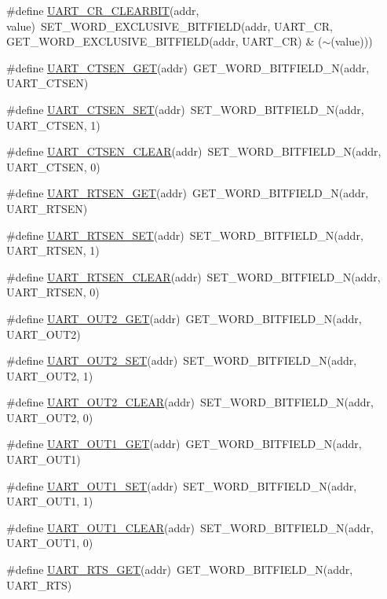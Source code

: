 \begin{DoxyCompactItemize}
\item 
\#define \hyperlink{a00574_aed8539f210ad9a5b33fb21ee09d866b7}{UART\_\-CR\_\-CLEARBIT}(addr, value)~SET\_\-WORD\_\-EXCLUSIVE\_\-BITFIELD(addr, UART\_\-CR, GET\_\-WORD\_\-EXCLUSIVE\_\-BITFIELD(addr, UART\_\-CR) \& ($\sim$(value)))
\item 
\#define \hyperlink{a00574_a334e7a89445e0c2c19ad77d695686531}{UART\_\-CTSEN\_\-GET}(addr)~GET\_\-WORD\_\-BITFIELD\_\-N(addr, UART\_\-CTSEN)
\item 
\#define \hyperlink{a00574_af7c724ef0e6b402b9fc5e025d7dbc9fe}{UART\_\-CTSEN\_\-SET}(addr)~SET\_\-WORD\_\-BITFIELD\_\-N(addr, UART\_\-CTSEN, 1)
\item 
\#define \hyperlink{a00574_ab7d94465632c8f5d8d71ff06ab55bbd3}{UART\_\-CTSEN\_\-CLEAR}(addr)~SET\_\-WORD\_\-BITFIELD\_\-N(addr, UART\_\-CTSEN, 0)
\item 
\#define \hyperlink{a00574_ab741bf76e9275d6099bbe2029d13bee0}{UART\_\-RTSEN\_\-GET}(addr)~GET\_\-WORD\_\-BITFIELD\_\-N(addr, UART\_\-RTSEN)
\item 
\#define \hyperlink{a00574_ac1fe85f27040aa47c3bbbb93650265bb}{UART\_\-RTSEN\_\-SET}(addr)~SET\_\-WORD\_\-BITFIELD\_\-N(addr, UART\_\-RTSEN, 1)
\item 
\#define \hyperlink{a00574_aaa58e49f6d0e233ddfe04583fc44ef4c}{UART\_\-RTSEN\_\-CLEAR}(addr)~SET\_\-WORD\_\-BITFIELD\_\-N(addr, UART\_\-RTSEN, 0)
\item 
\#define \hyperlink{a00574_a915133c5bcda60b5f3cc432fd790e73d}{UART\_\-OUT2\_\-GET}(addr)~GET\_\-WORD\_\-BITFIELD\_\-N(addr, UART\_\-OUT2)
\item 
\#define \hyperlink{a00574_a07bf858f9fc378827448ea3daf75b524}{UART\_\-OUT2\_\-SET}(addr)~SET\_\-WORD\_\-BITFIELD\_\-N(addr, UART\_\-OUT2, 1)
\item 
\#define \hyperlink{a00574_affe12b1eded41a7de880979833728aba}{UART\_\-OUT2\_\-CLEAR}(addr)~SET\_\-WORD\_\-BITFIELD\_\-N(addr, UART\_\-OUT2, 0)
\item 
\#define \hyperlink{a00574_a90b247e009c20ffa2bc6881e9b277e08}{UART\_\-OUT1\_\-GET}(addr)~GET\_\-WORD\_\-BITFIELD\_\-N(addr, UART\_\-OUT1)
\item 
\#define \hyperlink{a00574_aaac01b860127b0d118b6a7209c635e10}{UART\_\-OUT1\_\-SET}(addr)~SET\_\-WORD\_\-BITFIELD\_\-N(addr, UART\_\-OUT1, 1)
\item 
\#define \hyperlink{a00574_a9f755ef40051a60a6ca368b3efdd906e}{UART\_\-OUT1\_\-CLEAR}(addr)~SET\_\-WORD\_\-BITFIELD\_\-N(addr, UART\_\-OUT1, 0)
\item 
\#define \hyperlink{a00574_a02290a2b85a1fed0687a904272cc112d}{UART\_\-RTS\_\-GET}(addr)~GET\_\-WORD\_\-BITFIELD\_\-N(addr, UART\_\-RTS)

\end{DoxyCompactItemize}
